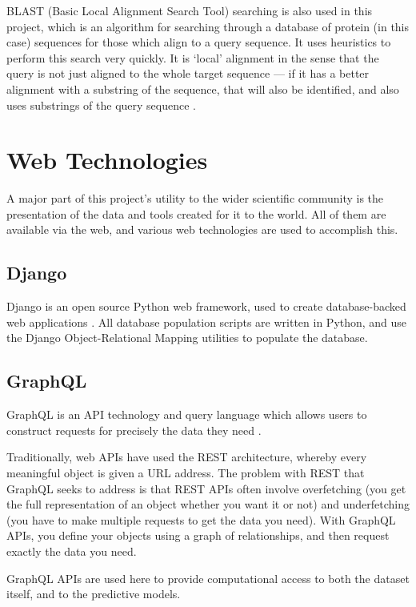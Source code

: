 BLAST (Basic Local Alignment Search Tool) searching is also used in this project, which is an algorithm for searching through a database of protein (in this case) sequences for those which align to a query sequence. It uses heuristics to perform this search very quickly. It is `local' alignment in the sense that the query is not just aligned to the whole target sequence --- if it has a better alignment with a substring of the sequence, that will also be identified, and also uses substrings of the query sequence \cite{zhang2000blast}.

\section{Web Technologies}

A major part of this project's utility to the wider scientific community is the presentation of the data and tools created for it to the world. All of them are available via the web, and various web technologies are used to accomplish this.

\subsection{Django}

Django is an open source Python web framework, used to create database-backed web applications \cite{django}. All database population scripts are written in Python, and use the Django Object-Relational Mapping utilities to populate the database.

\subsection{GraphQL}

GraphQL is an API technology and query language which allows users to construct requests for precisely the data they need \cite{graphql}.

Traditionally, web APIs have used the REST architecture, whereby every meaningful object is given a URL address. The problem with REST that GraphQL seeks to address is that REST APIs often involve overfetching (you get the full representation of an object whether you want it or not) and underfetching (you have to make multiple requests to get the data you need). With GraphQL APIs, you define your objects using a graph of relationships, and then request exactly the data you need.

GraphQL APIs are used here to provide computational access to both the dataset itself, and to the predictive models.

